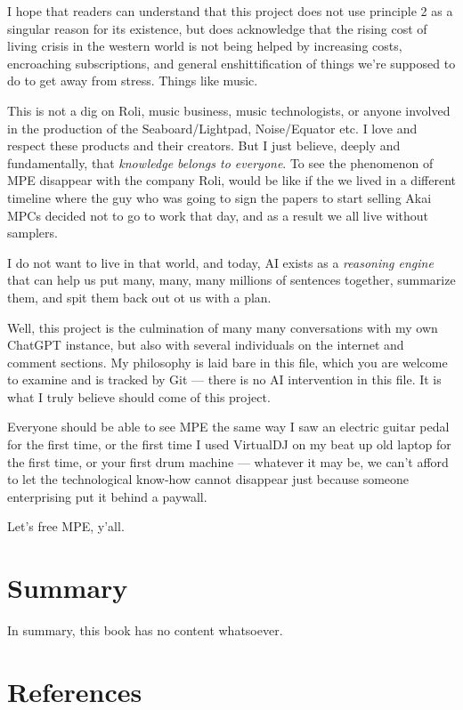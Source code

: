 \documentclass[
  letterpaper,
  DIV=11,
  numbers=noendperiod]{scrreprt}
\begin{document}
I hope that readers can understand that this project does not use
principle 2 as a singular reason for its existence, but does acknowledge
that the rising cost of living crisis in the western world is not being
helped by increasing costs, encroaching subscriptions, and general
enshittification of things we're supposed to do to get away from stress.
Things like music.

This is not a dig on Roli, music business, music technologists, or
anyone involved in the production of the Seaboard/Lightpad,
Noise/Equator etc. I love and respect these products and their creators.
But I just believe, deeply and fundamentally, that \emph{knowledge
belongs to everyone}. To see the phenomenon of MPE disappear with the
company Roli, would be like if the we lived in a different timeline
where the guy who was going to sign the papers to start selling Akai
MPCs decided not to go to work that day, and as a result we all live
without samplers.

I do not want to live in that world, and today, AI exists as a
\emph{reasoning engine} that can help us put many, many, many millions
of sentences together, summarize them, and spit them back out ot us with
a plan.

Well, this project is the culmination of many many conversations with my
own ChatGPT instance, but also with several individuals on the internet
and comment sections. My philosophy is laid bare in this file, which you
are welcome to examine and is tracked by Git --- there is no AI
intervention in this file. It is what I truly believe should come of
this project.

Everyone should be able to see MPE the same way I saw an electric guitar
pedal for the first time, or the first time I used VirtualDJ on my beat
up old laptop for the first time, or your first drum machine ---
whatever it may be, we can't afford to let the technological know-how
cannot disappear just because someone enterprising put it behind a
paywall.

Let's free MPE, y'all.


\chapter{Summary}\label{summary}

In summary, this book has no content whatsoever.


\chapter*{References}\label{references}


\protect{}\label{refs}
\end{document}
